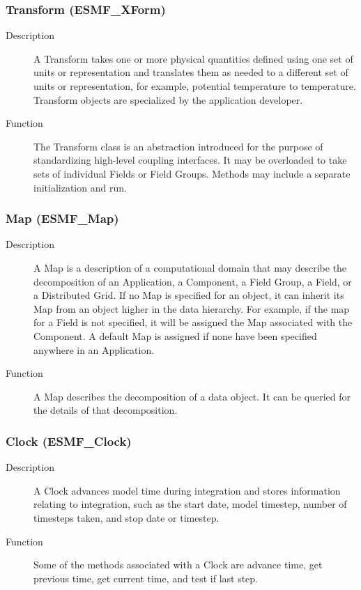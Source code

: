 \subsubsection{Transform (ESMF\_XForm)} 
\begin{description}
\item [Description] A Transform takes one or more physical quantities defined using one set 
of units or representation
and translates them as needed to a different set of units or representation, for example, 
potential temperature
to temperature.  Transform objects are specialized by the application developer.
\item [Function] The Transform class is an abstraction introduced for the
purpose of standardizing high-level coupling interfaces.  It may be overloaded
to take sets of individual Fields or Field Groups.  Methods may include a
separate initialization and run. 
\end{description}

\subsubsection{Map (ESMF\_Map)}
\label{sec:map} 
\begin{description}
\item [Description] A Map is a description of a computational domain that
may describe the decomposition of an Application, a Component, a Field Group, a Field, or 
a Distributed Grid.
If no Map is specified for an object, it can inherit its Map from an object
higher in the data hierarchy.  For example, if the map for a Field is not
specified, it will be assigned the Map associated with the Component.  A
default Map is assigned if none have been specified anywhere in an 
Application. 
\item [Function] A Map describes the decomposition of a data object.  It can be
queried for the details of that decomposition.
\end{description}

\subsubsection{Clock (ESMF\_Clock)}
\begin{description}
\item [Description] A Clock advances model time during integration and stores
information relating to integration, such as the start date, model timestep, number of 
timesteps taken, and stop date or timestep.
\item [Function] Some of the methods associated with a Clock are advance time,
get previous time, get current time, and test if last step. 
\end{description}  

